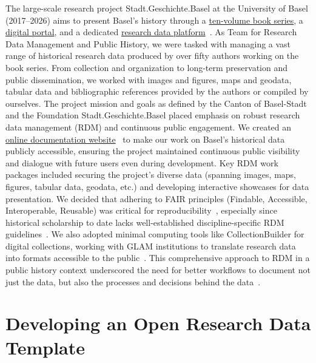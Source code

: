 \documentclass[final]{anthology-ch} %
\begin{document}
The large-scale research project Stadt.Geschichte.Basel at the University of Basel (2017--2026) aims to present Basel's history through a \href{https://emono.unibas.ch/stadtgeschichtebasel/}{ten-volume book series}, a \href{https://stadtgeschichtebasel.ch/}{digital portal}, and a dedicated \href{https://forschung.stadtgeschichtebasel.ch/}{research data platform}~\cite{goerlich2023}. As Team for Research Data Management and Public History, we were tasked with managing a vast range of historical research data produced by over fifty authors working on the book series. From collection and organization to long-term preservation and public dissemination, we worked with images and figures, maps and geodata, tabular data and bibliographic references provided by the authors or compiled by ourselves. The project mission and goals as defined by the Canton of Basel-Stadt and the Foundation Stadt.Geschichte.Basel placed emphasis on robust research data management (RDM) and continuous public engagement. We created an \href{https://dokumentation.stadtgeschichtebasel.ch/}{online documentation website}~\cite{maehr2024g} to make our work on Basel's historical data publicly accessible, ensuring the project maintained continuous public visibility and dialogue with future users even during development. Key RDM work packages included securing the project's diverse data (spanning images, maps, figures, tabular data, geodata, etc.) and developing interactive showcases for data presentation. We decided that adhering to FAIR principles (Findable, Accessible, Interoperable, Reusable) was critical for reproducibility~\cite{wilkinson2016}, especially since historical scholarship to date lacks well-established discipline-specific RDM guidelines~\cite{hiltmann2018, ruediger2023}. We also adopted minimal computing tools like CollectionBuilder for digital collections, working with GLAM institutions to translate research data into formats accessible to the public~\cite{mahr2023g}. This comprehensive approach to RDM in a public history context underscored the need for better workflows to document not just the data, but also the processes and decisions behind the data~\cite{borgman2012}.

\section{Developing an Open Research Data Template}\label{developing-an-open-research-data-template}
\end{document}
